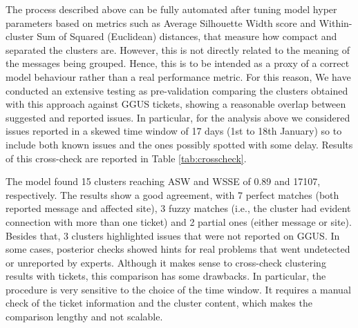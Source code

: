 The process described above can be fully automated after tuning model hyper parameters based on metrics such as Average Silhouette Width score
and Within-cluster Sum of Squared (Euclidean) distances, that measure how compact and separated the clusters are.
However, this is not directly related to the meaning of the messages being grouped. Hence, this is to be intended as a proxy of a correct model behaviour rather than a real performance metric.
For this reason, 
We have conducted an extensive testing as pre-validation comparing the clusters obtained with this approach against GGUS tickets, showing a reasonable overlap between suggested and reported issues. 
In particular, for the analysis above we considered issues reported in a skewed time window of 17 days (1st to 18th January) so to include both known issues and the ones possibly spotted with some delay.
Results of this cross-check are reported in Table \ref{tab:crosscheck}.

The model found 15 clusters reaching ASW and WSSE of 0.89 and 17107, respectively. The results show a good agreement, with 7 perfect matches (both reported message and affected site), 3 fuzzy matches (i.e., the cluster had evident connection with more than one ticket) and 2 partial ones (either message or site). Besides that, 3 clusters highlighted issues that were not reported on GGUS. In some cases, posterior checks showed hints for real problems that went undetected or unreported by experts. %
% 
Although it makes sense to cross-check clustering results with tickets, this comparison has some drawbacks. In particular, the procedure is very sensitive to the choice of the time window.
It requires a manual check of the ticket information and the cluster content, which makes the comparison lengthy and not scalable.
% 
